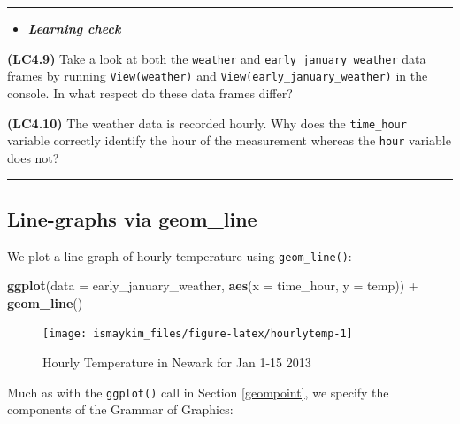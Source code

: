 \documentclass[]{tufte-book}
\newenvironment{Shaded}{\begin{snugshade}}{\end{snugshade}}
\newcommand{\KeywordTok}[1]{\textcolor[rgb]{0.13,0.29,0.53}{\textbf{{#1}}}}
\newcommand{\DataTypeTok}[1]{\textcolor[rgb]{0.13,0.29,0.53}{{#1}}}
\newcommand{\StringTok}[1]{\textcolor[rgb]{0.31,0.60,0.02}{{#1}}}
\newcommand{\NormalTok}[1]{{#1}}
\let\oldrule=\rule
\renewcommand{\rule}[1]{\oldrule{\linewidth}}
\newenvironment{rmdblock}[1]
  {\begin{shaded*}
  \begin{itemize}
  \renewcommand{\labelitemi}{
    \raisebox{-.7\height}[0pt][0pt]{
    }
  }
  \item
  }
  {
  \end{itemize}
  \end{shaded*}
  }
\newenvironment{learncheck}
  {\begin{rmdblock}{warning}}
  {\end{rmdblock}}
\theoremstyle{definition}
\theoremstyle{definition}
\theoremstyle{remark}
\begin{document}
\begin{center}\rule{0.5\linewidth}{\linethickness}\end{center}

\begin{learncheck}
\textbf{\emph{Learning check}}
\end{learncheck}

\textbf{(LC4.9)} Take a look at both the \texttt{weather} and
\texttt{early\_january\_weather} data frames by running
\texttt{View(weather)} and \texttt{View(early\_january\_weather)} in the
console. In what respect do these data frames differ?

\textbf{(LC4.10)} The weather data is recorded hourly. Why does the
\texttt{time\_hour} variable correctly identify the hour of the
measurement whereas the \texttt{hour} variable does not?

\begin{center}\rule{0.5\linewidth}{\linethickness}\end{center}

\subsection{Line-graphs via geom\_line}\label{geomline}

We plot a line-graph of hourly temperature using \texttt{geom\_line()}:

\begin{Shaded}
\begin{Highlighting}[]
\KeywordTok{ggplot}\NormalTok{(}\DataTypeTok{data =} \NormalTok{early_january_weather, }\KeywordTok{aes}\NormalTok{(}\DataTypeTok{x =} \NormalTok{time_hour, }\DataTypeTok{y =} \NormalTok{temp)) +}
\StringTok{  }\KeywordTok{geom_line}\NormalTok{()}
\end{Highlighting}
\end{Shaded}

\begin{figure}

{\centering \texttt{[image: ismaykim\_files/figure-latex/hourlytemp-1]} 

}

\caption[Hourly Temperature in Newark for Jan 1-15 2013]{Hourly Temperature in Newark for Jan 1-15 2013}\label{fig:hourlytemp}
\end{figure}

Much as with the \texttt{ggplot()} call in Section \ref{geompoint}, we
specify the components of the Grammar of Graphics:
\end{document}
